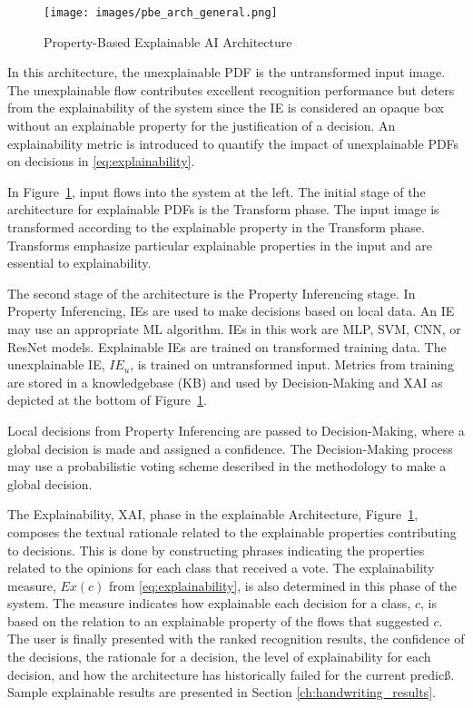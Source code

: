 \begin{figure}[H]
    \centering
    \texttt{[image: images/pbe\_arch\_general.png]}
    \caption{Property-Based Explainable AI Architecture}
    \label{fig:xai_arch}
\end{figure}

In this architecture, the unexplainable PDF is the untransformed input image.
The unexplainable flow contributes excellent recognition performance but deters
from the explainability of the system since the IE is considered an opaque box
without an explainable property for the justification of a decision. An
explainability metric is introduced to quantify the impact of unexplainable PDFs
on decisions in \eqref{eq:explainability}.

In Figure~\ref{fig:xai_arch}, input flows into the system at the left. The
initial stage of the architecture for explainable PDFs is the Transform phase.
The input image is transformed according to the explainable property in the
Transform phase. Transforms emphasize particular explainable properties in the
input and are essential to explainability.

The second stage of the architecture is the Property Inferencing stage. In
Property Inferencing, IEs are used to make decisions based on local data. An IE
may use an appropriate ML algorithm. IEs in this work are MLP, SVM, CNN, or
ResNet models. Explainable IEs are trained on transformed training data. The
unexplainable IE, $IE_u$, is trained on untransformed input. Metrics from
training are stored in a knowledgebase (KB) and used by Decision-Making and XAI
as depicted at the bottom of Figure~\ref{fig:xai_arch}.

Local decisions from Property Inferencing are passed to Decision-Making, where a
global decision is made and assigned a confidence. The Decision-Making process
may use a probabilistic voting scheme described in the methodology to make a
global decision.

The Explainability, XAI, phase in the explainable Architecture,
Figure~\ref{fig:xai_arch}, composes the textual rationale related to the
explainable properties contributing to decisions. This is done by constructing
phrases indicating the properties related to the opinions for each class that
received a vote. The explainability measure, $Ex(c)$ from
\eqref{eq:explainability}, is also determined in this phase of the system. The
measure indicates how explainable each decision for a class, $c$, is based on
the relation to an explainable property of the flows that suggested $c$. The
user is finally presented with the ranked recognition results, the confidence of
the decisions, the rationale for a decision, the level of explainability for
each decision, and how the architecture has historically failed for the current
predicß. Sample explainable results are presented in Section
\ref{ch:handwriting_results}.

